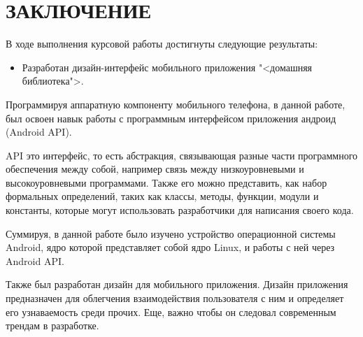 \chapter*{ЗАКЛЮЧЕНИЕ}
В ходе выполнения курсовой работы достигнуты следующие результаты:

\begin{itemize}
	\item Разработан дизайн-интерфейс мобильного приложения
		"<домашняя библиотека">.
\end{itemize}

Программируя аппаратную компоненту мобильного телефона, в данной
работе, был освоен навык работы с программным интерфейсом приложения
андроид (Android API).\par
API это интерфейс, то есть абстракция, связывающая разные части
программного обеспечения между собой, например связь между
низкоуровневыми и высокоуровневыми программами. Также его можно
представить, как набор формальных определений, таких как классы, методы,
функции, модули и константы, которые могут использовать разработчики для
написания своего кода.\par
Суммируя, в данной работе было изучено устройство операционной
системы Android, ядро которой представляет собой ядро Linux, и работы с ней
через Android API.\par
Также был разработан дизайн для мобильного приложения. Дизайн
приложения предназначен для облегчения взаимодействия пользователя с ним
и определяет его узнаваемость среди прочих. Еще, важно чтобы он следовал
современным трендам в разработке.

